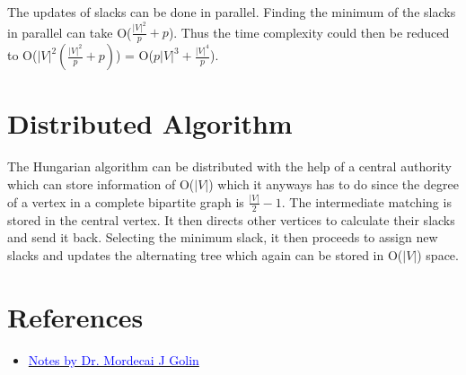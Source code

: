 The updates of slacks can be done in parallel. Finding the minimum of the slacks in parallel can take O($\frac{|V|^2}{p}+p$). Thus the time complexity could then be reduced to O($|V|^2(\frac{|V|^2}{p}+p)$) = O($p|V|^3 + \frac{|V|^4}{p}$).

\section{Distributed Algorithm}
The Hungarian algorithm can be distributed with the help of a central authority which can store information of O($|V|$) which it anyways has to do since the degree of a vertex in a complete bipartite graph is $\frac{|V|}{2}-1$. The intermediate matching is stored in the central vertex. It then directs other vertices to calculate their slacks and send it back. Selecting the minimum slack, it then proceeds to assign new slacks and updates the alternating tree which again can be stored in O($|V|$) space.

\section{References}

\begin{itemize}
    \item \href{http://www.cse.ust.hk/~golin/COMP572/Notes/Matching.pdf}{\textcolor{blue}{Notes by Dr. Mordecai J Golin}}
\end{itemize}


% 